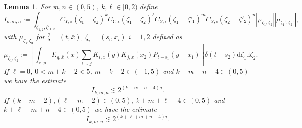 \documentclass[a4paper,11pt]{article}
\newcommand{\assign}{:=}
\newcommand{\mathd}{\mathrm{d}}
\newtheorem{lemma}[theorem]{Lemma}
{\theorembodyfont{\rmfamily}\newtheorem{remark}[theorem]{Remark}}
\begin{document}
\begin{lemma}
  \label{l:integral-est-final}For $m, n \in (0, 5)$, $k, \ell \in [0, 2)$
  define
  \[ I_{k, m, n} \assign \int_{\zeta_{1, 2}, \zeta'_{1, 2}} C_{Y, \varepsilon}
     (\zeta_1 - \zeta_2)^k C_{Y, \varepsilon} (\zeta_1 - \zeta_2)^{\ell} C_{Y,
     \varepsilon} (\zeta_1 - \zeta'_1)^m C_{Y, \varepsilon} (\zeta_2 -
     \zeta'_2)^n | \mu_{\zeta_1, \zeta_2} | | \mu_{\zeta_1', \zeta_2'} |, \]
  with $\mu_{\zeta_1, \zeta_2}$ for $\bar{\zeta} = (t, \bar{x})$, $\zeta_i =
  (s_i, x_i)$ $i = 1, 2$ defined as
  \[ \mu_{\zeta_1, \zeta_2} \assign [\int_{x, y} K_{q, \bar{x}} (x) \sum_{i
     \sim j} K_{i, x} (y) K_{j, x} (x_2) P_{t - s_1} (y - x_1)] \delta (t -
     s_2) \mathd \zeta_1 \mathd \zeta_2 . \]
  If $\ell = 0$, $0 < m + k - 2 < 5$, $m + k - 2 \in (- 1, 5)$ and $k + m + n
  - 4 \in (0, 5)$ we have the estimate
  \[ I_{k, m, n} \lesssim 2^{(k + m + n - 4) q} . \]
  If $(k + m - 2), (\ell + m - 2) \in (0, 5)$, $k + m + \ell - 4 \in (0, 5)$
  and $k + \ell + m + n - 4 \in (0, 5)$ we have the estimate
  \[ I_{k, m, n} \lesssim 2^{(k + \ell + m + n - 4) q} . \]
\end{lemma}
\end{document}
